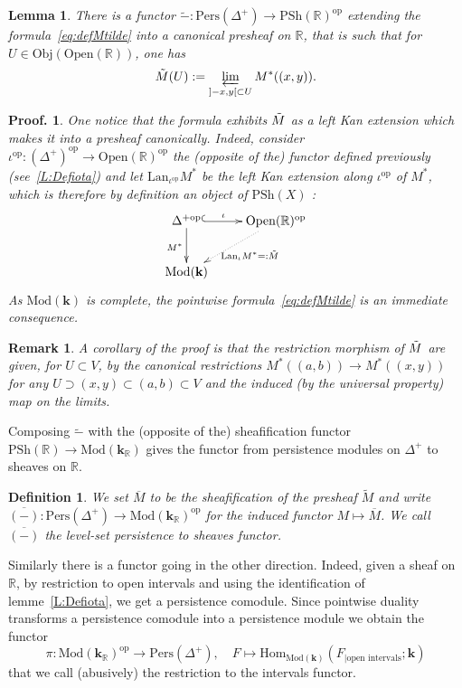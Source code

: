 \documentclass[a4paper, english, 11pt]{article}
\newcommand{\kk}[0]{\textbf{k}}
\newcommand{\Mod}[0]{\text{Mod}}
\newcommand{\Pe}{\text{Pers}}
\newcommand{\0}{\vec{0}}
\newcommand{\R}[0]{\mathbb{R}}
\newcommand{\Obj}[0]{\text{Obj}}
\newcommand{\Ouv}[0]{\mathrm{Open}}
\newcommand{\op}[0]{\text{op}}
\newcommand{\Hom}[0]{\text{Hom}}
\newtheorem*{pf}{Proof.} }
\newtheorem{remark}[prop]{Remark}
\newtheorem{lem}[prop]{Lemma}
\newtheorem{defi}[prop]{Definition}
\begin{document}
\begin{lem} There is a functor $\tilde{-}: \Pe(\Delta^+)\to \text{PSh}(\R)^{\op}$   extending the formula~\eqref{eq:defMtilde} into a canonical presheaf on $\R$, that is such that for   $U \in \Obj(\Ouv(\R))$, one has $$\Tilde{M} (U):=  \varprojlim_{]-x,y[\subset U} M^*((x,y)).$$ 
\end{lem}
\begin{pf} One notice that the formula exhibits  $\Tilde{M}$ as a  left Kan extension which makes it into a presheaf canonically. Indeed, 
 consider $\iota^\text{op} : (\Delta^{+})^{\op}\longrightarrow \Ouv(\R)^{\op}$ the (opposite of the) functor defined previously (see~\ref{L:Defiota}) and let  $\text{Lan}_{\iota^\text{op}} M^*$  be the left Kan extension along $\iota^\text{op}$ of $M^*$, which is therefore by definition an object of $\text{PSh}(X)$ : 
$$\xymatrix{ \Delta^{+\text{op}}
\ar@{^{(}->}[r]^-{\iota} \ar[d]_{M^*} & \Ouv(\R)^\text{op} \ar@{.>}[dl]^{\text{Lan}_\iota M^* =: \Tilde{M}} \\
\Mod(\kk) & } $$
As $\Mod(\kk)$ is complete,  the pointwise formula~\eqref{eq:defMtilde} is an immediate consequence.  
\end{pf}
\begin{remark}
 A corollary of the proof is that the restriction morphism of $\Tilde{M}$ are given, for $U\subset V$, by the canonical restrictions $M^*((a,b)) \to M^*((x,y))$ for any $ U\supset (x,y) \subset (a,b)\subset V$ and the induced (by the universal property) map on the limits. 
\end{remark}
Composing $\tilde{-}$ with the (opposite of the) sheafification functor $ \text{PSh}(\R) \to \Mod(\kk_{\R})$ gives the functor from persistence modules on $\Delta^{+}$ to sheaves on $\R$. 
\begin{defi}\label{D:defofBar}
We set $\overline{M}$ to be the sheafification of the presheaf $\tilde{M}$ and write 
$\overline{(-)} : \Pe(\Delta^+)\longrightarrow \Mod (\kk_\R)^{\op}$ for the induced functor $M\mapsto \overline{M}$. We call $\overline{(-)}$ the level-set persistence to sheaves functor. 
\end{defi}
Similarly there is a functor going in the other direction. Indeed, given a sheaf on $\R$, by restriction to open intervals and using the identification of lemme~\ref{L:Defiota}, we get a persistence comodule. Since pointwise duality transforms a persistence comodule into a persistence module we obtain the functor 
\begin{equation}
 \label{eq:defpi}  \pi : \Mod(\kk_\R)^{\op} \longrightarrow \Pe(\Delta^+), \quad F\mapsto \Hom_{\Mod(\kk)}(F_{ | \text{open intervals}};\kk)
\end{equation}
that we call (abusively) the restriction to the intervals functor.
\end{document}
